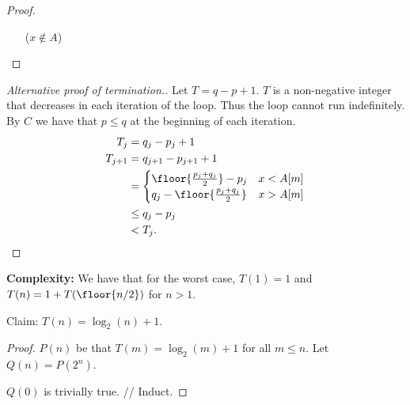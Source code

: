 \begin{solution}
\begin{proof}
\begin{enumerate}
                Let $p_{j}, q_{j}$ be the values of $p, q$ at the beginning of
                the $j$-th iteration.
                For the $(j + 1)$-th iteration, we have that if $x = A[m]$, the
                procedure terminates.
                Otherwise,
                \begin{align*}
                    q_{j + 1} - p_{j + 1} &= \begin{cases}
                        \floor{\frac{p_{j} + q_{j}}{2}} - 1 - p_{j} & x < A[m] \\
                        q_{j} - \floor{\frac{p_{j} + q_{j}}{2}} - 1 & x > A[m]
                    \end{cases} \\
                        &\leq q_{j} - p_{j} - 1 \\
                        &< q_{j} - p_{j}.
                \end{align*}
                Thus the procedure must terminate.
            \item[($x \notin A$)] \qedhere
        \end{enumerate}
    \end{proof}
    \begin{proof}
        [Alternative proof of termination.]
        Let $T = q - p + 1$.
        $T$ is a non-negative integer that decreases in each iteration of the
        loop.
        Thus the loop cannot run indefinitely.
        By $C$ we have that $p \leq q$ at the beginning of each iteration.
        \begin{align*}
            T_{j} &= q_{j} - p_{j} + 1 \\
            T_{j + 1} &= q_{j + 1} - p_{j + 1} + 1 \\
                &= \begin{cases}
                    \floor{\frac{p_{j} + q_{j}}{2}} - p_{j} & x < A[m] \\
                    q_{j} - \floor{\frac{p_{j} + q_{j}}{2}} & x > A[m]
                \end{cases} \\
                &\leq q_{j} - p_{j} \\
                &< T_{j}. \qedhere
        \end{align*}
    \end{proof}

    \textbf{Complexity:}
    We have that for the worst case,
    $T(1) = 1$ and $T(n) = 1 + T(\floor{n/2})$ for $n > 1$.

    Claim: $T(n) = \log_{2}(n) + 1$.
    \begin{proof}
        $P(n)$ be that $T(m) = \log_{2}(m) + 1$ for all $m \leq n$.
        Let $Q(n) = P(2^{n})$.

        $Q(0)$ is trivially true.
        // Induct.
    \end{proof}
\end{solution}

